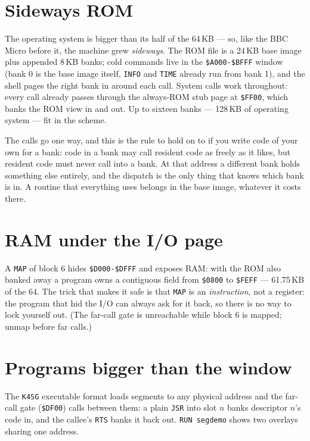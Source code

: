 \section{Sideways ROM}
The operating system is bigger than its half of the 64\,KB --- so, like
the BBC Micro before it, the machine grew \emph{sideways}. The ROM file
is a 24\,KB base image plus appended 8\,KB banks; cold commands live in
the \texttt{\$A000-\$BFFF} window (bank 0 is the base image itself,
\texttt{INFO} and \texttt{TIME} already run from bank 1), and the shell
pages the right bank in around each call. System calls work throughout:
every call already passes through the always-ROM stub page at
\texttt{\$FF00}, which banks the ROM view in and out. Up to sixteen
banks --- 128\,KB of operating system --- fit in the scheme.

The calls go one way, and this is the rule to hold on to if you write
code of your own for a bank: code in a bank may call resident code as
freely as it likes, but resident code must never call into a bank. At
that address a different bank holds something else entirely, and the
dispatch is the only thing that knows which bank is in. A routine that
everything uses belongs in the base image, whatever it costs there.

\section{RAM under the I/O page}
A \texttt{MAP} of block 6 hides \texttt{\$D000-\$DFFF} and exposes RAM:
with the ROM also banked away a program owns a contiguous field from
\texttt{\$0800} to \texttt{\$FEFF} --- 61.75\,KB of the 64. The trick
that makes it safe is that \texttt{MAP} is an \emph{instruction}, not a
register: the program that hid the I/O can always ask for it back, so
there is no way to lock yourself out. (The far-call gate is unreachable
while block 6 is mapped; unmap before far calls.)

\section{Programs bigger than the window}
The \texttt{K4SG} executable format loads segments to any physical address
and the far-call gate (\verb|$DF00|) calls between them: a plain \verb|JSR|
into slot $n$ banks descriptor $n$'s code in, and the callee's \verb|RTS|
banks it back out. \verb|RUN segdemo| shows two overlays sharing one
address.
